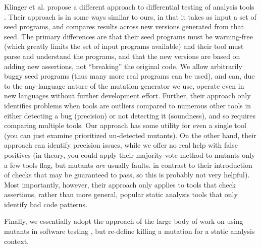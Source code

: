 Klinger et al. propose a different approach to differential testing of analysis tools \cite{klinger2019differentially}.  Their approach is in some ways similar to ours, in that it takes as input a set of seed programs, and compares results across new versions generated from that seed.  The primary differences are that their seed programs must be warning-free (which greatly limits the set of input programs available) and their tool must parse and understand the programs, and that the new versions are based on adding new assertions, not ``breaking'' the original code.  We allow arbitrarily buggy seed programs (thus many more real programs can be used), and can, due to the any-language nature of the mutation generator we use, operate even in new languages without further development effort.  Further, their approach only identifies problems when tools are outliers compared to numerous other tools in either detecting a bug (precision) or not detecting it (soundness), and so requires comparing multiple tools.  Our approach has some utility for even a single tool (you can just examine prioritized un-detected mutants).  On the other hand, their approach can identify precision issues, while we offer no real help with false positives (in theory, you could apply their majority-vote method to mutants only a few tools flag, but mutants \emph{are} usually faults. in contrast to their introduction of checks that may be guaranteed to pass, so this is probably not very helpful).  Most importantly, however, their approach only applies to tools that check assertions, rather than more general, popular static analysis tools that only identify bad code patterns.

Finally, we essentially adopt the approach of the large body of work on using mutants in software testing \cite{jia2011analysis,demillo1978hints,budd1980theoretical, groce2015verified,groce2018verified,MutGoogle,ivankovic2018industrial,mutKernel}, but re-define killing a mutation for a static analysis context.